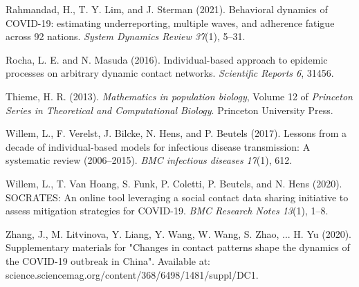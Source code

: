 \documentclass[12pt]{article}
\begin{document}
\begin{singlespace}
\begin{footnotesize}
\begin{list}{}{\setlength{\topsep}{8pt}\setlength{\leftmargin}{0.1in}%
\setlength{\listparindent}{-0.1in}\setlength{\itemindent}{-0.1in}%
\setlength{\parsep}{0.6em}}
\item
Rahmandad, H., T. Y. Lim, and J. Sterman (2021). Behavioral dynamics of
COVID-19: estimating underreporting, multiple waves, and adherence fatigue
across 92 nations. \textit{System Dynamics Review 37}(1), 5--31.%

\item
Rocha, L. E. and N. Masuda (2016). Individual-based approach to epidemic
processes on arbitrary dynamic contact networks. \textit{Scientific Reports
6}, 31456.%

\item
Thieme, H. R. (2013). \textit{Mathematics in population biology}, Volume 12 of
\textit{Princeton Series in Theoretical and Computational Biology}. Princeton
University Press.%

\item
Willem, L., F. Verelst, J. Bilcke, N. Hens, and P. Beutels (2017). Lessons
from a decade of individual-based models for infectious disease transmission:
A systematic review (2006--2015). \textit{BMC infectious diseases}
\textit{17}(1), 612.%

\item
Willem, L., T. Van Hoang, S. Funk, P. Coletti, P. Beutels, and N. Hens (2020).
SOCRATES: An online tool leveraging a social contact data sharing initiative
to assess mitigation strategies for COVID-19. \textit{BMC Research Notes
13}(1), 1--8.%

\item
Zhang, J., M. Litvinova, Y. Liang, Y. Wang, W. Wang, S. Zhao, ... H. Yu
(2020). Supplementary materials for "Changes in contact patterns shape the
dynamics of the COVID-19 outbreak in China". Available at: science.sciencemag.org/content/368/6498/1481/suppl/DC1.%

\end{list}%
%

\end{footnotesize}
\end{singlespace}%
\pagebreak%
\end{document}
